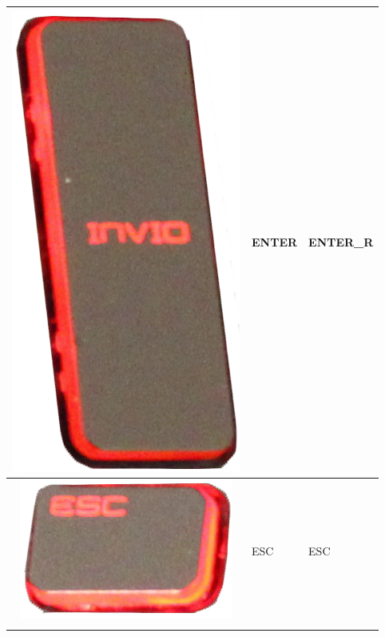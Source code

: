 \begin{longtable}{|cll|}
\begin{minipage}[c]{.4\textwidth}
\includegraphics[scale=0.08]{Images/KeyMapping/ENTER_R}
\vspace{0.2cm}
\end{minipage} & ENTER & ENTER\_R\\
\hline
\begin{minipage}[c]{.4\textwidth}
\vspace{0.2cm}
\includegraphics[scale=0.08]{Images/KeyMapping/ESC}
\vspace{0.2cm}
\end{minipage} & ESC & ESC\\
\hline
\begin{minipage}[c]{.4\textwidth}
\vspace{0.2cm}

\end{minipage}
\end{longtable}
